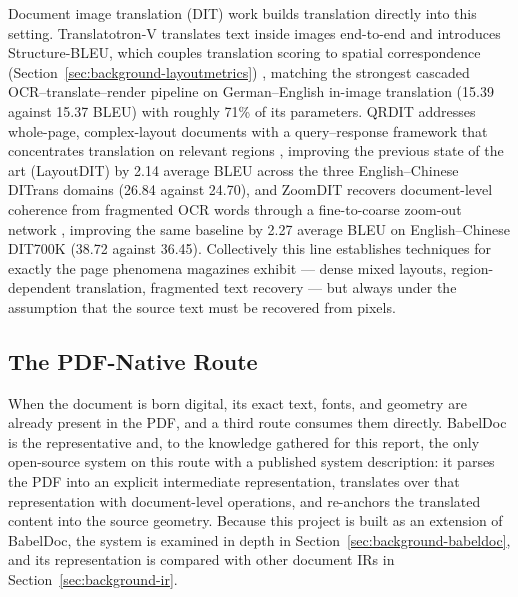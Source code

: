 Document image translation (DIT) work builds translation directly into
this setting. Translatotron-V translates text inside images end-to-end
and introduces Structure-BLEU, which couples translation scoring to
spatial correspondence
(Section~\ref{sec:background-layoutmetrics})
\cite{lan2024translatotron}, matching the strongest cascaded
OCR--translate--render pipeline on German--English in-image
translation (15.39 against 15.37 BLEU) with roughly 71\% of its
parameters. QRDIT addresses whole-page,
complex-layout documents with a query--response framework that
concentrates translation on relevant regions \cite{zhang2025query},
improving the previous state of the art (LayoutDIT) by 2.14 average
BLEU across the three English--Chinese DITrans domains (26.84 against
24.70), and ZoomDIT recovers document-level coherence from fragmented OCR
words through a fine-to-coarse zoom-out network \cite{zhang2025chaotic},
improving the same baseline by 2.27 average BLEU on English--Chinese
DIT700K (38.72 against 36.45).
Collectively this line establishes techniques for exactly the page
phenomena magazines exhibit --- dense mixed layouts, region-dependent
translation, fragmented text recovery --- but always under the
assumption that the source text must be recovered from pixels.

\subsection{The PDF-Native Route}
\label{sec:background-routes-pdfnative}

When the document is born digital, its exact text, fonts, and geometry
are already present in the PDF, and a third route consumes them
directly. BabelDoc \cite{qi2026babeldoc} is the representative and,
to the knowledge gathered for this report, the only open-source system
on this route with a published system description: it parses the PDF
into an explicit intermediate representation, translates over that
representation with document-level operations, and re-anchors the
translated content into the source geometry. Because this project is
built as an extension of BabelDoc, the system is examined in depth in
Section~\ref{sec:background-babeldoc}, and its representation is compared with
other document IRs in Section~\ref{sec:background-ir}.

